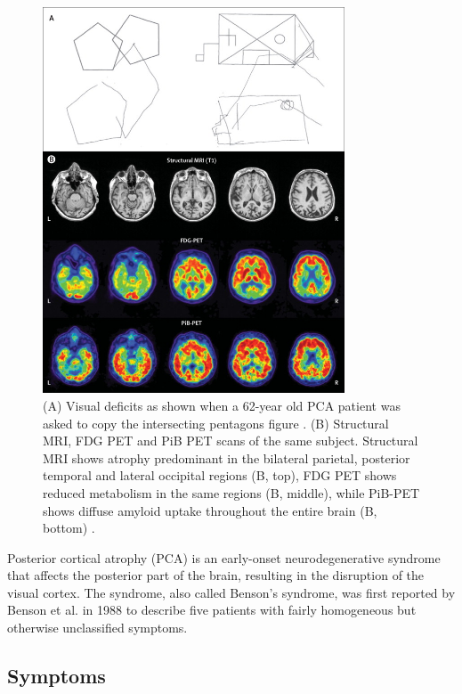 \begin{figure}
\centering
\includegraphics[width=0.8\textwidth]{images/pcaImagingDrawing}
\caption[Visual deficits and neuroimaging pathology in Posterior Cortical Atrophy]{(A) Visual deficits as shown when a 62-year old PCA patient was asked to copy the intersecting pentagons figure \cite{crutch2012posterior}. (B) Structural MRI, FDG PET and PiB PET scans of the same subject. Structural MRI shows atrophy predominant in the bilateral parietal, posterior temporal and lateral occipital regions (B, top), FDG PET shows reduced metabolism in the same regions (B, middle), while PiB-PET shows diffuse amyloid uptake throughout the entire brain (B, bottom) \cite{crutch2012posterior}.  }
\label{fig:bckPcaImg}
\end{figure}

Posterior cortical atrophy (PCA) is an early-onset neurodegenerative syndrome that affects the posterior part of the brain, resulting in the disruption of the visual cortex. The syndrome, also called Benson's syndrome, was first reported by Benson et al. \cite{benson1988posterior} in 1988 to describe five patients with fairly homogeneous but otherwise unclassified symptoms.  

\subsection{Symptoms}
\label{sec:bckPcaSym}

